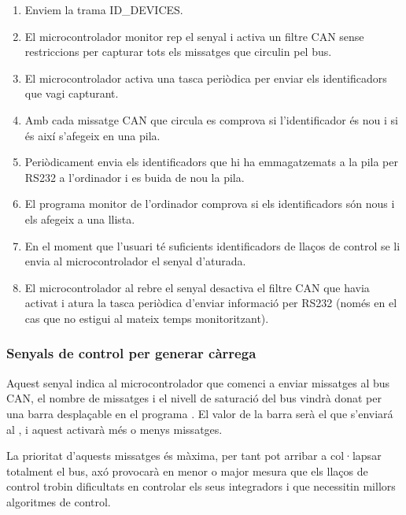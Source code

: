 \begin{enumerate}
	\item Enviem la trama ID\_DEVICES.
	\item El microcontrolador monitor rep el senyal i activa un filtre CAN sense restriccions per capturar tots els missatges que circulin pel bus.
	\item El microcontrolador activa una tasca periòdica per enviar els identificadors que vagi capturant.
	\item Amb cada missatge CAN que circula es comprova si l'identificador és nou i si és així s'afegeix en una pila.
	\item Periòdicament envia els identificadors que hi ha emmagatzemats a la pila per RS232 a l'ordinador i es buida de nou la pila.
	\item El programa monitor de l'ordinador comprova si els identificadors són nous i els afegeix a una llista.
	\item En el moment que l'usuari té suficients identificadors de llaços de control se li envia al microcontrolador el senyal d'aturada.
	\item El microcontrolador al rebre el senyal desactiva el filtre CAN que havia activat i atura la tasca periòdica d'enviar informació per RS232 (només en el cas que no estigui al mateix temps monitoritzant).
\end{enumerate}


\subsubsection{Senyals de control per generar càrrega}\label{cap:dis:comSer:percent}

Aquest senyal indica al microcontrolador que comenci a enviar missatges al bus CAN, el nombre de missatges i el nivell de saturació del bus vindrà donat per una barra desplaçable en el programa \DCSMonitor. El valor de la barra serà el que s'enviará al \Monitor, i aquest activarà més o menys missatges.

La prioritat d'aquests missatges és màxima, per tant pot arribar a col·lapsar totalment el bus, axó provocarà en menor o major mesura que els llaços de control trobin dificultats en controlar els seus integradors i que necessitin millors algoritmes de control.

